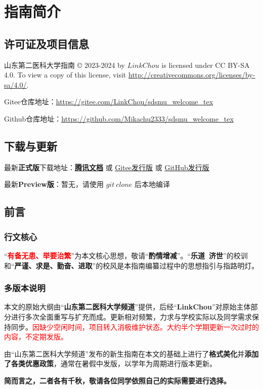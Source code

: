 \chapter[指南简介]{指南简介}

\section[许可证及项目信息]{许可证及项目信息}
山东第二医科大学指南 © 2023-2024 by $LinkChou$ is licensed under CC BY-SA 4.0. To view a copy of this license, visit \uline{\href{http://creativecommons.org/licenses/by-sa/4.0/}{http://creativecommons.org/licenses/by-sa/4.0/}}.

Gitee仓库地址：\uline{\href{https://gitee.com/LinkChou/sdsmu_welcome_tex}{https://gitee.com/LinkChou/sdsmu\_welcome\_tex}}

Github仓库地址：\uline{\href{https://github.com/Mikachu2333/sdsmu_welcome_tex}{https://github.com/Mikachu2333/sdsmu\_welcome\_tex}}

\section[\textcolor{red}{下载与更新}]{下载与更新}
最新\textbf{正式版}下载地址：\textbf{\uline{\textcolor{red}{\href{https://docs.qq.com/s/ETcQ-ZFSrSsh6MK9bm773q}{腾讯文档}}}} 或 \uline{\href{https://gitee.com/LinkChou/sdsmu_welcome_tex/releases/latest}{Gitee发行版}} 或 \uline{\href{https://github.com/mikachu2333/sdsmu_welcome_tex/releases/latest}{GitHub发行版}}

最新\textbf{Preview版}\footnotemark：暂无，请使用 $git\ clone$ 后本地编译

\section[前言]{前言}
\subsection[行文核心]{行文核心}
“\textcolor{red}{\textbf{有备无患、举要治繁}}”为本文核心思想，敬请“\textbf{酌情增减}”。“\textbf{乐道\ 济世}”的校训和“\textbf{严谨、求是、勤奋、进取}”的校风是本指南编纂过程中的思想指引与指路明灯。

\subsection[多版本说明]{多版本说明}
本文的原始大纲由“\textbf{山东第二医科大学频道}”提供，后经“\textbf{LinkChou}”对原始主体部分进行多次全面重写与扩充而成。更新相对频繁，力求与学校实际以及同学需求保持同步。\textcolor{red}{因缺少空闲时间，项目转入消极维护状态。大约半个学期更新一次过时的内容，不定期发版。}

由“山东第二医科大学频道”发布的新生指南在本文的基础上进行了\textbf{格式美化}并\textbf{添加了各类优惠政策}，通常在暑假中发版，以学年为周期进行版本更新。

\textbf{简而言之，二者各有千秋，敬请各位同学依照自己的实际需要进行选择。}
